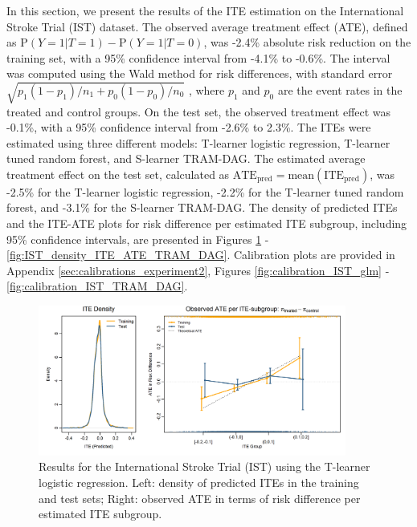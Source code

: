 In this section, we present the results of the ITE estimation on the International Stroke Trial (IST) dataset. The observed average treatment effect (ATE), defined as $\text{P}(Y=1|T=1) - \text{P}(Y=1|T=0)$, was -2.4\% absolute risk reduction on the training set, with a 95\% confidence interval from -4.1\% to -0.6\%. The interval was computed using the Wald method for risk differences, with standard error $\sqrt{p_1 (1 - p_1)/n_1 + p_0 (1 - p_0)/n_0}$
, where $p_1$ and $p_0$ are the event rates in the treated and control groups. On the test set, the observed treatment effect was -0.1\%, with a 95\% confidence interval from -2.6\% to 2.3\%. The ITEs were estimated using three different models: T-learner logistic regression, T-learner tuned random forest, and S-learner TRAM-DAG. The estimated average treatment effect on the test set, calculated as $\text{ATE}_\text{pred}=\text{mean}(\text{ITE}_\text{pred})$, was -2.5\% for the T-learner logistic regression, -2.2\% for the T-learner tuned random forest, and -3.1\% for the S-learner TRAM-DAG. The density of predicted ITEs and the ITE-ATE plots for risk difference per estimated ITE subgroup, including 95\% confidence intervals, are presented in Figures \ref{fig:IST_density_ITE_ATE_glm_tlearner} - \ref{fig:IST_density_ITE_ATE_TRAM_DAG}. Calibration plots are provided in Appendix \ref{sec:calibrations_experiment2}, Figures \ref{fig:calibration_IST_glm} - \ref{fig:calibration_IST_TRAM_DAG}. 




\begin{figure}[htbp]
\centering
\includegraphics[width=0.9\textwidth]{img/results_IST/glm_tlearner_density_ITE_ATE.png}
\caption{Results for the International Stroke Trial (IST) using the T-learner logistic regression. Left: density of predicted ITEs in the training and test sets; Right: observed ATE in terms of risk difference per estimated ITE subgroup.}
\label{fig:IST_density_ITE_ATE_glm_tlearner}
\end{figure}



